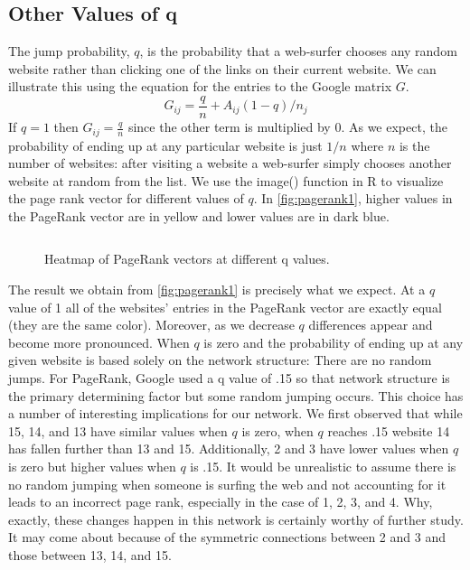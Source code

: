 \documentclass{article}
\begin{document}
\subsection{Other Values of q}
The jump probability, $q$, is the probability that a web-surfer chooses any random website rather than clicking one of the links on their current website. We can illustrate this using the equation for the entries to the Google matrix $G$. 
\[G_{ij}=\frac{q}{n}+A_{ij}(1-q)/n_j\]
If \(q=1\) then \(G_{ij}=\frac{q}{n}\) since the other term is multiplied by 0. As we expect, the probability of ending up at any particular website is just $1/n$ where $n$ is the number of websites: after visiting a website a web-surfer simply chooses another website at random from the list. We use the image() function in R to visualize the page rank vector for different values of $q$. In \autoref{fig:pagerank1}, higher values in the PageRank vector are in yellow and lower values are in dark blue. 

\begin{figure}[H]
$$
 
$$
\vspace{-0.4in}
\caption{Heatmap of PageRank vectors at different q values.}
\label{fig:pagerank1}
\end{figure}


The result we obtain from \autoref{fig:pagerank1} is precisely what we expect. At a $q$ value of 1 all of the websites' entries in the PageRank vector are exactly equal (they are the same color). Moreover, as we decrease $q$ differences appear and become more pronounced. When $q$ is zero and the probability of ending up at any given website is based solely on the network structure: There are no random jumps. For PageRank, Google used a q value of .15 so that network structure is the primary determining factor but some random jumping occurs. 
This choice has a number of interesting implications for our network. We first observed that while 15, 14, and 13 have similar values when $q$ is zero, when $q$ reaches .15 website 14 has fallen further than 13 and 15. Additionally, 2 and 3 have lower values when $q$ is zero but higher values when $q$ is .15. It would be unrealistic to assume there is no random jumping when someone is surfing the web and not accounting for it leads to an incorrect page rank, especially in the case of 1, 2, 3, and 4. Why, exactly, these changes happen in this network is certainly worthy of further study. It may come about because of the symmetric connections between 2 and 3 and those between 13, 14, and 15.
\end{document}
